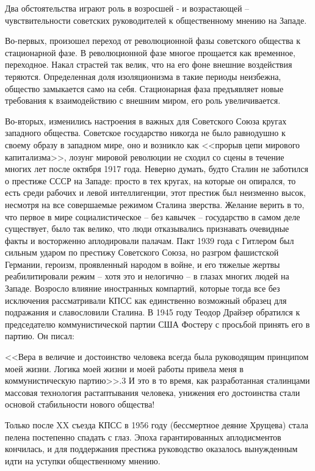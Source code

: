 \documentclass{book}
\begin{document}
Два обстоятельства играют роль в возросшей - и возрас­тающей -- чувствительности советских руководителей к общест­венному мнению на Западе.

Во-первых, произошел переход от революционной фазы советского общества к стационарной фазе. В революционной фазе многое прощается как временное, переходное. Накал страстей так велик, что на его фоне внешние воздействия теря­ются. Определенная доля изоляционизма в такие периоды неизбежна, общество замыкается само на себя. Стационарная фаза предъявляет новые требования к взаимодействию с внеш­ним миром, его роль увеличивается.

Во-вторых, изменились настроения в важных для Советско­го Союза кругах западного общества. Советское государство никогда не было равнодушно к своему образу в западном ми­ре, оно и возникло как <<прорыв цепи мирового капитализма>>, лозунг мировой революции не сходил со сцены в течение многих лет после октября 1917 года. Неверно думать, будто Сталин не заботился о престиже СССР на Западе: просто в тех кругах, на которые он опирался, то есть среди рабочих и левой интел­лигенции, этот престиж был неизменно высок, несмотря на все совершаемые режимом Сталина зверства. Желание верить в то, что первое в мире социалистическое -- без кавычек -- го­сударство в самом деле существует, было так велико, что люди отказывались признавать очевидные факты и восторженно аплодировали палачам. Пакт 1939 года с Гитлером был силь­ным ударом по престижу Советского Союза, но разгром фа­шистской Германии, героизм, проявленный народом в войне, и его тяжелые жертвы реабилитировали режим -- хотя это и нелогично -- в глазах многих людей на 
Западе. Возросло вли­яние иностранных компартий, которые тогда все без исключения рассматривали КПСС как единственно возможный образец для подражания и славословили Сталина. В 1945 году Теодор Драйзер обратился к председателю коммунистической партии США Фостеру с просьбой принять его в партию. Он писал:

<<Вера в величие и достоинство человека всегда была руководящим принципом моей жизни. Логика моей жизни и моей работы привела меня в коммунистическую партию>>.3 И это в то время, как разработанная сталинцами массовая технология растаптывания человека, унижения его достоинства стали основой стабильности нового общества!

Только после XX съезда КПСС в 1956 году (бессмертное деяние Хрущева) стала пелена постепенно спадать с глаз. Эпо­ха гарантированных аплодисментов кончилась, и для поддер­жания престижа руководство оказалось вынужденным идти на уступки общественному мнению.
\end{document}
